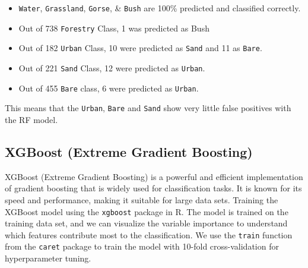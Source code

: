 \documentclass[
]{article}
\begin{document}
\begin{itemize}
\item
  \texttt{Water}, \texttt{Grassland}, \texttt{Gorse}, \& \texttt{Bush}
  are 100\% predicted and classified correctly.
\item
  Out of 738 \texttt{Forestry} Class, 1 was predicted as Bush
\item
  Out of 182 \texttt{Urban} Class, 10 were predicted as \texttt{Sand}
  and 11 as \texttt{Bare}.
\item
  Out of 221 \texttt{Sand} Class, 12 were predicted as \texttt{Urban}.
\item
  Out of 455 \texttt{Bare} class, 6 were predicted as \texttt{Urban}.
\end{itemize}

This means that the \texttt{Urban}, \texttt{Bare} and \texttt{Sand} show
very little false positives with the RF model.

\subsection{XGBoost (Extreme Gradient Boosting)}\label{xgboost}

XGBoost (Extreme Gradient Boosting) is a powerful and efficient
implementation of gradient boosting that is widely used for
classification tasks. It is known for its speed and performance, making
it suitable for large data sets. Training the XGBoost model using the
\texttt{xgboost} package in R. The model is trained on the training data
set, and we can visualize the variable importance to understand which
features contribute most to the classification. We use the
\texttt{train} function from the \texttt{caret} package to train the
model with 10-fold cross-validation for hyperparameter tuning.
\end{document}
